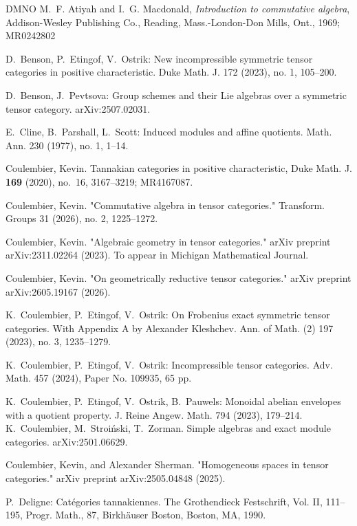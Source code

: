 \documentclass[11pt]{amsart}
\theoremstyle{definition}
\theoremstyle{remark}
\numberwithin{equation}{section}
\begin{document}
\begin{thebibliography}
	{DMNO}
	 M.~F. Atiyah and I.~G. Macdonald, {\it Introduction to commutative algebra}, Addison-Wesley Publishing Co., Reading, Mass.-London-Don Mills, Ont., 1969; MR0242802
	
	 D.~Benson, P.~Etingof, V.~Ostrik:
New incompressible symmetric tensor categories in positive characteristic.
Duke Math. J. 172 (2023), no. 1, 105--200.

 D.~Benson, J.~Pevtsova: Group schemes and their Lie algebras over a symmetric tensor category. arXiv:2507.02031.




  E.~Cline, B.~Parshall, L.~Scott: Induced modules and affine quotients. Math. Ann. 230 (1977), no. 1, 1--14. 

 Coulembier, Kevin. Tannakian categories in positive characteristic, Duke Math. J. {\bf 169} (2020), no.~16, 3167--3219; MR4167087.

     Coulembier, Kevin. "Commutative algebra in tensor categories." Transform. Groups 31 (2026), no. 2, 1225--1272.

     Coulembier, Kevin. "Algebraic geometry in tensor categories." arXiv preprint arXiv:2311.02264 (2023). To appear in Michigan Mathematical Journal.

     Coulembier, Kevin. "On geometrically reductive tensor categories." arXiv preprint arXiv:2605.19167 (2026).

     K.~Coulembier, P.~Etingof, V.~Ostrik:
On Frobenius exact symmetric tensor categories.
With Appendix A by Alexander Kleshchev.
Ann. of Math. (2) 197 (2023), no. 3, 1235--1279.
	
	 K.~Coulembier, P.~Etingof, V.~Ostrik:
Incompressible tensor categories.
Adv. Math. 457 (2024), Paper No. 109935, 65 pp.

	K.~Coulembier, P.~Etingof, V.~Ostrik, B.~Pauwels:
Monoidal abelian envelopes with a quotient property.
J. Reine Angew. Math. 794 (2023), 179--214.
	 K.~Coulembier, M.~Stroiński, T.~Zorman. Simple algebras and exact module categories. arXiv:2501.06629.


     Coulembier, Kevin, and Alexander Sherman. "Homogeneous spaces in tensor categories." arXiv preprint arXiv:2505.04848 (2025).

 P.~Deligne: Cat\'egories tannakiennes. The Grothendieck Festschrift, Vol. II, 111--195, Progr. Math., 87, Birkh\"auser Boston, Boston, MA, 1990. 




\end{thebibliography}
\end{document}
